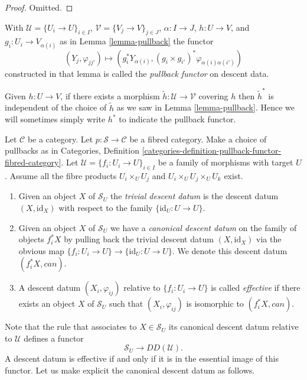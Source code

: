 \begin{proof}
Omitted.
\end{proof}

\begin{definition}
\label{definition-pullback-functor}
With $\mathcal{U} = \{U_i \to U\}_{i \in I}$,
$\mathcal{V} = \{V_j \to V\}_{j \in J}$,
$\alpha : I \to J$, $h : U \to V$,
and $g_i : U_i \to V_{\alpha(i)}$ as in Lemma \ref{lemma-pullback}
the functor
$$
(Y_j, \varphi_{jj'}) \longmapsto
(g_i^*Y_{\alpha(i)}, (g_i \times g_{i'})^*\varphi_{\alpha(i)\alpha(i')})
$$
constructed in that lemma
is called the {\it pullback functor} on descent data.
\end{definition}

\noindent
Given $h : U \to V$, if there exists a morphism
$\tilde h : \mathcal{U} \to \mathcal{V}$ covering $h$
then $\tilde h^*$ is independent of the choice of
$\tilde h$ as we saw in Lemma \ref{lemma-pullback}.
Hence we will sometimes simply write $h^*$ to indicate
the pullback functor.

\begin{definition}
\label{definition-effective-descent-datum}
Let $\mathcal{C}$ be a category.
Let $p : \mathcal{S} \to \mathcal{C}$ be a fibred category.
Make a choice of pullbacks as in Categories,
Definition \ref{categories-definition-pullback-functor-fibred-category}.
Let $\mathcal{U} = \{f_i : U_i \to U\}_{i \in I}$ be a family of morphisms
with target $U$. Assume all the fibre products
$U_i \times_U U_j$ and $U_i \times_U U_j \times_U U_k$ exist.
\begin{enumerate}
\item Given an object $X$ of $\mathcal{S}_U$ the {\it trivial descent datum}
is the descent datum $(X, \text{id}_X)$ with respect to the family
$\{\text{id}_U : U \to U\}$.
\item Given an object $X$ of $\mathcal{S}_U$
we have a {\it canonical descent datum} on the family of
objects $f_i^*X$ by pulling back the trivial
descent datum $(X, \text{id}_X)$ via the
obvious map $\{f_i : U_i \to U\} \to \{\text{id}_U : U \to U\}$.
We denote this descent datum $(f_i^*X, can)$.
\item A descent datum $(X_i, \varphi_{ij})$
relative to $\{f_i : U_i \to U\}$ is called {\it effective}
if there exists an object $X$ of $\mathcal{S}_U$ such that
$(X_i, \varphi_{ij})$ is isomorphic to $(f_i^*X, can)$.
\end{enumerate}
\end{definition}

\noindent
Note that the rule that associates to $X \in \mathcal{S}_U$ its
canonical descent datum relative to $\mathcal{U}$ defines a
functor
$$
\mathcal{S}_U \longrightarrow DD(\mathcal{U}).
$$
A descent datum is effective if and only if it is in the essential
image of this functor.
Let us make explicit the canonical descent datum as follows.

